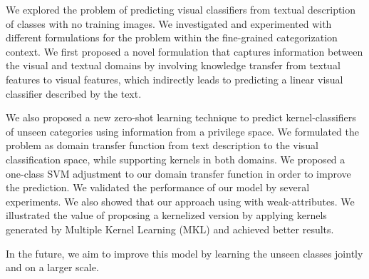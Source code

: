 We explored the problem of predicting visual classifiers from textual description of classes with no training images.  We investigated and  experimented with different formulations for the problem within the fine-grained categorization context.  We first proposed  a novel formulation that captures information between the visual and textual domains by involving knowledge transfer from textual features to visual features, which indirectly leads to predicting a linear visual classifier described by the text.  We also proposed a new zero-shot learning technique to predict kernel-classifiers of unseen categories using information from a privilege space. We formulated the problem as domain transfer function from text description  to the visual classification space, while supporting kernels in both domains. We proposed a one-class SVM adjustment to our domain transfer function in order to improve the prediction. We validated the performance of our model by several experiments. We also showed that   our approach using with weak-attributes. We illustrated the value of proposing a kernelized version by applying kernels generated by Multiple Kernel Learning (MKL) and achieved better results.   In the future, we aim to improve this model by learning the unseen classes jointly and on a larger scale. %


